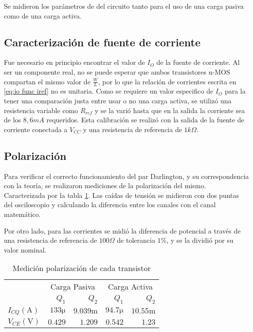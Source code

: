 Se midieron los parámetros de del circuito tanto para el uso de una carga pasiva como de una carga activa.

\subsection{Caracterización de fuente de corriente}

Fue necesario en principio encontrar el valor de $I_O$ de la fuente de corriente. Al ser un componente real, no se puede esperar que ambos transistores n-MOS compartan el mismo valor de $\frac{W}{L}$, por lo que la relación de corrientes escrita en \ref{eq:io func iref} no es unitaria.
Como se requiere un valor especifico de $I_O$ para la tener una comparación justa entre usar o no una carga activa, se utilizó una resistencia variable como $R_{ref}$ y se la varió hasta que en la salida la corriente sea de los $8,6 mA$ requeridos. Esta calibración se realizó con la salida de la fuente de corriente conectada a $V_{CC}$ y una resistencia de referencia de $1k\Omega$.

\subsection{Polarización}

Para verificar el correcto funcionamiento del par Darlington, y su correspondencia con la teoría, se realizaron mediciones de la polarización del mismo. Caracterizada por la tabla \ref{table:pola medida}. Las caídas de tensión se midieron con dos puntas del osciloscopio y calculando la diferencia entre los canales con el canal matemático.

Por otro lado, para las corrientes se midió la diferencia de potencial a través de una resistencia de referencia de $100 \Omega$ de tolerancia $1\%$, y se la dividió por su valor nominal.

\begin{table}[ht]
    \centering
    \begin{tabular}{|l|r|r|r|r|}
        \hline
        \multirow{2}{*}{} & \multicolumn{2}{c|}{Carga Pasiva} & \multicolumn{2}{c|}{Carga Activa} \\ \cline{2-5} 
         & $Q_1$ & $Q_2$ & $Q_1$ & $Q_2$ \\ \hline

        $I_{CQ} (\si{\ampere})$ & $133 \si{\micro}$& $9.039\si{\milli}$ & $94.7 \si{\micro}$& $10.55\si{\milli}$\\
        $V_{CE} (\si{\volt})$   & $0.429$            & $1.209$ & $0.542$ & $1.23$ \\ \hline       
    \end{tabular}
    \caption{Medición polarización de cada transistor}
    \label{table:pola medida}
\end{table}

